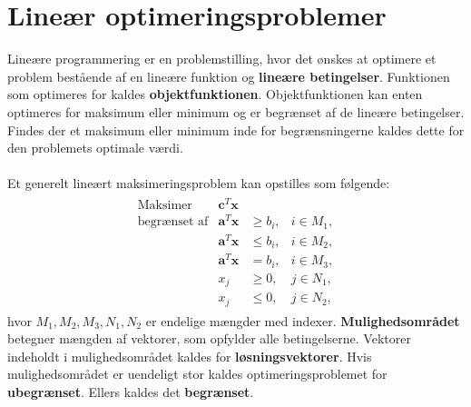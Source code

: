 \chapter{Lineær optimeringsproblemer}
%
Lineære programmering er en problemstilling, hvor det ønskes at optimere et problem bestående af en lineære funktion og \textbf{lineære betingelser}.
Funktionen som optimeres for kaldes \textbf{objektfunktionen}.
Objektfunktionen kan enten optimeres for maksimum eller minimum og er begrænset af de lineære betingelser.
Findes der et maksimum eller minimum inde for begrænsningerne kaldes dette for den problemets optimale værdi.
\\\\
Et generelt lineært maksimeringsproblem kan opstilles som følgende:
%
\begin{align*}
\begin{array}{lrll}
\text{Maksimer}		&\textbf{c}^T\textbf{x}	&			&\\
\text{begrænset af}	&\textbf{a}^T\textbf{x}	&\geq b_i,	&i \in M_1,\\
					&\textbf{a}^T\textbf{x}	&\leq b_i,	&i \in M_2,\\
					&\textbf{a}^T\textbf{x}	& = b_i,	&i \in M_3,\\
					&x_j					&\geq 0,	&j \in N_1,\\
					&x_j					&\leq 0,	&j \in N_2,
\end{array}
\end{align*}
%
hvor $M_1, M_2, M_3, N_1, N_2$ er endelige mængder med indexer.
\textbf{Mulighedsområdet} betegner mængden af vektorer, som opfylder alle betingelserne.
Vektorer indeholdt i mulighedsområdet kaldes for \textbf{løsningsvektorer}.
Hvis mulighedsområdet er uendeligt stor kaldes optimeringsproblemet for \textbf{ubegrænset}.
Ellers kaldes det \textbf{begrænset}.\\\\
%
